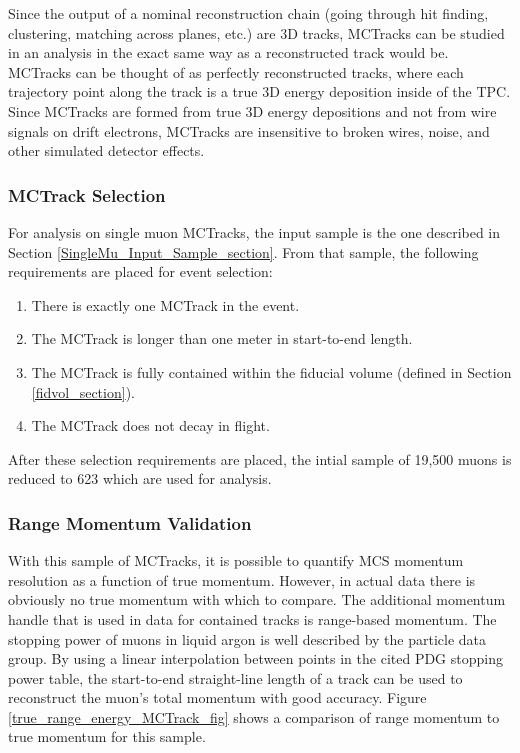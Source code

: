 Since the output of a nominal reconstruction chain (going through hit finding, clustering, matching across planes, etc.) are 3D tracks, {\sc MCTracks} can be studied in an analysis in the exact same way as a reconstructed track would be. {\sc MCTracks} can be thought of as perfectly reconstructed tracks, where each trajectory point along the track is a true 3D energy deposition inside of the {\ub} TPC.\\

Since {\sc MCTracks} are formed from true 3D energy depositions and not from wire signals on drift electrons, {\sc MCTracks} are insensitive to broken wires, noise, and other simulated detector effects.

\subsubsection{MCTrack Selection}\label{MCTrack_Selection_section}
For analysis on single muon {\sc MCTracks}, the input sample is the one described in Section \ref{SingleMu_Input_Sample_section}. From that sample, the following requirements are placed for event selection:
\begin{enumerate}
	\item There is exactly one {\sc MCTrack} in the event.
	\item The {\sc MCTrack} is longer than one meter in start-to-end length.
	\item The {\sc MCTrack} is fully contained within the fiducial volume (defined in Section \ref{fidvol_section}).
	\item The {\sc MCTrack} does not decay in flight.
\end{enumerate}
After these selection requirements are placed, the intial sample of 19,500 muons is reduced to 623 which are used for analysis.

\subsubsection{Range Momentum Validation}\label{Range_Momentum_Validation_section}
With this sample of {\sc MCTracks}, it is possible to quantify MCS momentum resolution as a function of true momentum. However, in actual {\ub} data there is obviously no true momentum with which to compare. The additional momentum handle that is used in data for contained tracks is range-based momentum. The stopping power of muons in liquid argon is well described by the particle data group\cite{PDG_spline_table}. By using a linear interpolation between points in the cited PDG stopping power table, the start-to-end straight-line length of a track can be used to reconstruct the muon's total momentum with good accuracy. Figure \ref{true_range_energy_MCTrack_fig} shows a comparison of range momentum to true momentum for this sample. \\

